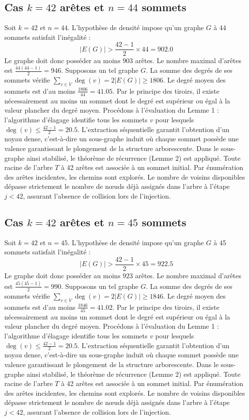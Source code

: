 \documentclass[12pt,a4paper]{article}
\begin{document}
\subsection{Cas $k = 42$ arêtes et $n = 44$ sommets}
Soit $k = 42$ et $n = 44$. L'hypothèse de densité impose qu'un graphe $G$ à 44 sommets satisfait l'inégalité :
$$ |E(G)| > \frac{42-1}{2} \times 44 = 902.0 $$
Le graphe doit donc posséder au moins $903$ arêtes. Le nombre maximal d'arêtes est $\frac{44(44-1)}{2} = 946$.
Supposons un tel graphe $G$. La somme des degrés de ses sommets vérifie $\sum_{v \in V} \deg(v) = 2|E(G)| \geq 1806$.
Le degré moyen des sommets est d'au moins $\frac{1806}{44} = 41.05$.
Par le principe des tiroirs, il existe nécessairement au moins un sommet dont le degré est supérieur ou égal à la valeur plancher du degré moyen.
Procédons à l'évaluation du Lemme 1 : l'algorithme d'élagage identifie tous les sommets $v$ pour lesquels $\deg(v) \leq \frac{42-1}{2} = 20.5$.
L'extraction séquentielle garantit l'obtention d'un noyau dense, c'est-à-dire un sous-graphe induit où chaque sommet possède une valence garantissant le plongement de la structure arborescente.
Dans le sous-graphe ainsi stabilisé, le théorème de récurrence (Lemme 2) est appliqué. Toute racine de l'arbre $T$ à 42 arêtes est associée à un sommet initial. Par énumération des arêtes incidentes, les chemins sont explorés. Le nombre de voisins disponibles dépasse strictement le nombre de nœuds déjà assignés dans l'arbre à l'étape $j < 42$, assurant l'absence de collision lors de l'injection.

\subsection{Cas $k = 42$ arêtes et $n = 45$ sommets}
Soit $k = 42$ et $n = 45$. L'hypothèse de densité impose qu'un graphe $G$ à 45 sommets satisfait l'inégalité :
$$ |E(G)| > \frac{42-1}{2} \times 45 = 922.5 $$
Le graphe doit donc posséder au moins $923$ arêtes. Le nombre maximal d'arêtes est $\frac{45(45-1)}{2} = 990$.
Supposons un tel graphe $G$. La somme des degrés de ses sommets vérifie $\sum_{v \in V} \deg(v) = 2|E(G)| \geq 1846$.
Le degré moyen des sommets est d'au moins $\frac{1846}{45} = 41.02$.
Par le principe des tiroirs, il existe nécessairement au moins un sommet dont le degré est supérieur ou égal à la valeur plancher du degré moyen.
Procédons à l'évaluation du Lemme 1 : l'algorithme d'élagage identifie tous les sommets $v$ pour lesquels $\deg(v) \leq \frac{42-1}{2} = 20.5$.
L'extraction séquentielle garantit l'obtention d'un noyau dense, c'est-à-dire un sous-graphe induit où chaque sommet possède une valence garantissant le plongement de la structure arborescente.
Dans le sous-graphe ainsi stabilisé, le théorème de récurrence (Lemme 2) est appliqué. Toute racine de l'arbre $T$ à 42 arêtes est associée à un sommet initial. Par énumération des arêtes incidentes, les chemins sont explorés. Le nombre de voisins disponibles dépasse strictement le nombre de nœuds déjà assignés dans l'arbre à l'étape $j < 42$, assurant l'absence de collision lors de l'injection.
\end{document}
